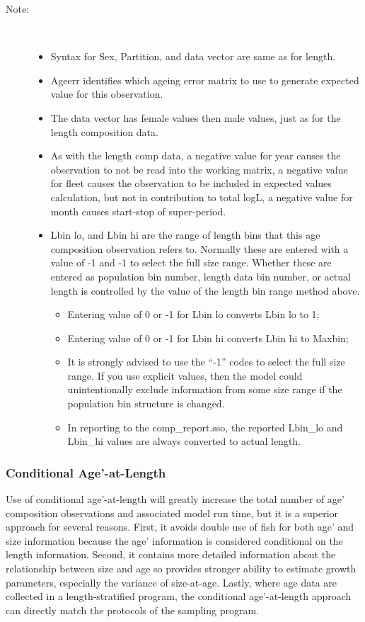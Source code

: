 \begin{description}
	\item[Note:]\
	\begin{itemize}		
		\item Syntax for Sex, Partition, and data vector are same as for length.
		\item Ageerr identifies which ageing error matrix to use to generate expected value for this observation.
		\item The data vector has female values then male values, just as for the length composition data.
		\item As with the length comp data, a negative value for year causes the observation to not be read into the working matrix, a negative value for fleet causes the observation to be included in expected values calculation, but not in contribution to total logL, a negative value for month causes start-stop of super-period.
		\item Lbin lo, and Lbin hi are the range of length bins that this age composition observation refers to.  Normally these are entered with a value of -1 and -1 to select the full size range.  Whether these are entered as population bin number, length data bin number, or actual length is controlled by the value of the length bin range method above.
		\begin{itemize}
			\item Entering value of 0 or -1 for Lbin lo converts Lbin lo to 1;
			\item Entering value of 0 or -1 for Lbin hi converts Lbin hi to Maxbin;
			\item It is strongly advised to use the “-1” codes to select the full size range.  If you use explicit values, then the model could unintentionally exclude information from some size range if the population bin structure is changed.
			\item In reporting to the comp\_report.sso, the reported Lbin\_lo and Lbin\_hi values are always converted to actual length.
		\end{itemize}			  
	\end{itemize}
\end{description}

\subsubsection{Conditional Age'-at-Length}
Use of conditional age’-at-length will greatly increase the total number of age’ composition observations and associated model run time, but it is a superior approach for several reasons.  First, it avoids double use of fish for both age’ and size information because the age’ information is considered conditional on the length information.  Second, it contains more detailed information about the relationship between size and age so provides stronger ability to estimate growth parameters, especially the variance of size-at-age.  Lastly, where age data are collected in a length-stratified program, the conditional age’-at-length approach can directly match the protocols of the sampling program.


